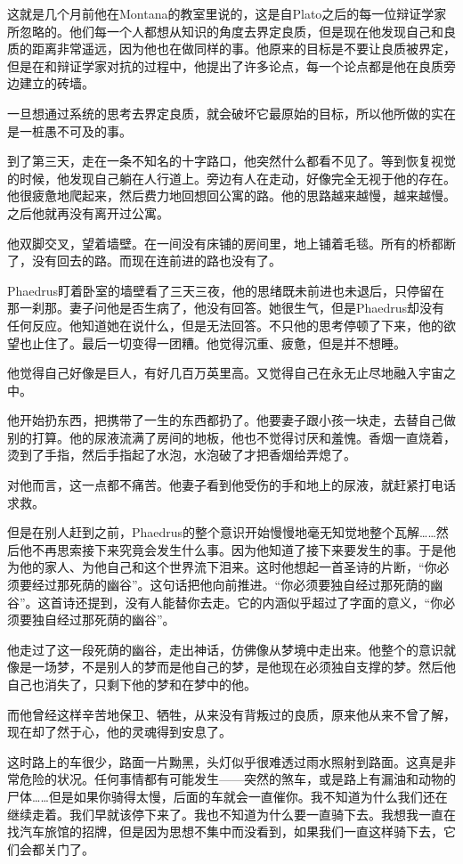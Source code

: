 \documentclass[UTF8]{article}
\begin{document}
\par 这就是几个月前他在Montana的教室里说的，这是自Plato之后的每一位辩证学家所忽略的。他们每一个人都想从知识的角度去界定良质，但是现在他发现自己和良质的距离非常遥远，因为他也在做同样的事。他原来的目标是不要让良质被界定，但是在和辩证学家对抗的过程中，他提出了许多论点，每一个论点都是他在良质旁边建立的砖墙。
\par 一旦想通过系统的思考去界定良质，就会破坏它最原始的目标，所以他所做的实在是一桩愚不可及的事。
\par 到了第三天，走在一条不知名的十字路口，他突然什么都看不见了。等到恢复视觉的时候，他发现自己躺在人行道上。旁边有人在走动，好像完全无视于他的存在。他很疲惫地爬起来，然后费力地回想回公寓的路。他的思路越来越慢，越来越慢。之后他就再没有离开过公寓。
\par 他双脚交叉，望着墙壁。在一间没有床铺的房间里，地上铺着毛毯。所有的桥都断了，没有回去的路。而现在连前进的路也没有了。
\par Phaedrus盯着卧室的墙壁看了三天三夜，他的思绪既未前进也未退后，只停留在那一刹那。妻子问他是否生病了，他没有回答。她很生气，但是Phaedrus却没有任何反应。他知道她在说什么，但是无法回答。不只他的思考停顿了下来，他的欲望也止住了。最后一切变得一团糟。他觉得沉重、疲惫，但是并不想睡。
\par 他觉得自己好像是巨人，有好几百万英里高。又觉得自己在永无止尽地融入宇宙之中。
\par 他开始扔东西，把携带了一生的东西都扔了。他要妻子跟小孩一块走，去替自己做别的打算。他的尿液流满了房间的地板，他也不觉得讨厌和羞愧。香烟一直烧着，烫到了手指，然后手指起了水泡，水泡破了才把香烟给弄熄了。
\par 对他而言，这一点都不痛苦。他妻子看到他受伤的手和地上的尿液，就赶紧打电话求救。
\par 但是在别人赶到之前，Phaedrus的整个意识开始慢慢地毫无知觉地整个瓦解……然后他不再思索接下来究竟会发生什么事。因为他知道了接下来要发生的事。于是他为他的家人、为他自己和这个世界流下泪来。这时他想起一首圣诗的片断，“你必须要经过那死荫的幽谷”。这句话把他向前推进。“你必须要独自经过那死荫的幽谷”。这首诗还提到，没有人能替你去走。它的内涵似乎超过了字面的意义，“你必须要独自经过那死荫的幽谷”。
\par 他走过了这一段死荫的幽谷，走出神话，仿佛像从梦境中走出来。他整个的意识就像是一场梦，不是别人的梦而是他自己的梦，是他现在必须独自支撑的梦。然后他自己也消失了，只剩下他的梦和在梦中的他。
\par 而他曾经这样辛苦地保卫、牺牲，从来没有背叛过的良质，原来他从来不曾了解，现在却了然于心，他的灵魂得到安息了。
\par 这时路上的车很少，路面一片黝黑，头灯似乎很难透过雨水照射到路面。这真是非常危险的状况。任何事情都有可能发生——突然的煞车，或是路上有漏油和动物的尸体……但是如果你骑得太慢，后面的车就会一直催你。我不知道为什么我们还在继续走着。我们早就该停下来了。我也不知道为什么要一直骑下去。我想我一直在找汽车旅馆的招牌，但是因为思想不集中而没看到，如果我们一直这样骑下去，它们会都关门了。
\end{document}
